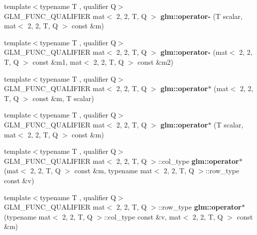 \begin{DoxyCompactItemize}
\item 
\mbox{\label{type__mat2x2_8inl_ab1508d8f7697189f83fa786e66533ccc}} 
{\footnotesize template$<$typename T , qualifier Q$>$ }\\G\+L\+M\+\_\+\+F\+U\+N\+C\+\_\+\+Q\+U\+A\+L\+I\+F\+I\+ER mat$<$ 2, 2, T, Q $>$ {\bfseries glm\+::operator-\/} (T scalar, mat$<$ 2, 2, T, Q $>$ const \&m)
\item 
\mbox{\label{type__mat2x2_8inl_a201b559537ef9c60afcbc3b9907943e2}} 
{\footnotesize template$<$typename T , qualifier Q$>$ }\\G\+L\+M\+\_\+\+F\+U\+N\+C\+\_\+\+Q\+U\+A\+L\+I\+F\+I\+ER mat$<$ 2, 2, T, Q $>$ {\bfseries glm\+::operator-\/} (mat$<$ 2, 2, T, Q $>$ const \&m1, mat$<$ 2, 2, T, Q $>$ const \&m2)
\item 
\mbox{\label{type__mat2x2_8inl_a10927c695f87f4e9a4c9b6493980b842}} 
{\footnotesize template$<$typename T , qualifier Q$>$ }\\G\+L\+M\+\_\+\+F\+U\+N\+C\+\_\+\+Q\+U\+A\+L\+I\+F\+I\+ER mat$<$ 2, 2, T, Q $>$ {\bfseries glm\+::operator$\ast$} (mat$<$ 2, 2, T, Q $>$ const \&m, T scalar)
\item 
\mbox{\label{type__mat2x2_8inl_aed9324ded8d99d04c11469336712e453}} 
{\footnotesize template$<$typename T , qualifier Q$>$ }\\G\+L\+M\+\_\+\+F\+U\+N\+C\+\_\+\+Q\+U\+A\+L\+I\+F\+I\+ER mat$<$ 2, 2, T, Q $>$ {\bfseries glm\+::operator$\ast$} (T scalar, mat$<$ 2, 2, T, Q $>$ const \&m)
\item 
\mbox{\label{type__mat2x2_8inl_a3cd60e902ab9b6dbef3d0fa73d3277e1}} 
{\footnotesize template$<$typename T , qualifier Q$>$ }\\G\+L\+M\+\_\+\+F\+U\+N\+C\+\_\+\+Q\+U\+A\+L\+I\+F\+I\+ER mat$<$ 2, 2, T, Q $>$\+::col\+\_\+type {\bfseries glm\+::operator$\ast$} (mat$<$ 2, 2, T, Q $>$ const \&m, typename mat$<$ 2, 2, T, Q $>$\+::row\+\_\+type const \&v)
\item 
\mbox{\label{type__mat2x2_8inl_a71f3cfd138e28f76eb62c264a7ea1d27}} 
{\footnotesize template$<$typename T , qualifier Q$>$ }\\G\+L\+M\+\_\+\+F\+U\+N\+C\+\_\+\+Q\+U\+A\+L\+I\+F\+I\+ER mat$<$ 2, 2, T, Q $>$\+::row\+\_\+type {\bfseries glm\+::operator$\ast$} (typename mat$<$ 2, 2, T, Q $>$\+::col\+\_\+type const \&v, mat$<$ 2, 2, T, Q $>$ const \&m)

\end{DoxyCompactItemize}
